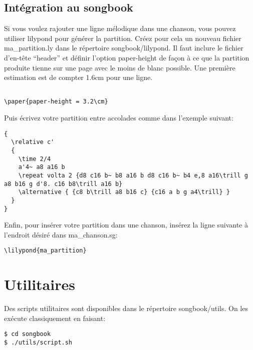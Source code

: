 \documentclass[a4paper,twoside]{article}
\begin{document}
\subsection{Intégration au songbook}

Si vous voulez rajouter une ligne mélodique dans une chanson, vous
pouvez utiliser lilypond pour générer la partition. Créez pour cela un
nouveau fichier ma\_partition.ly dans le répertoire songbook/lilypond.
Il faut inclure le fichier d'en-tête ``header'' et définir l'option
paper-height de façon à ce que la partition produite tienne sur une
page avec le moins de blanc possible. Une première estimation est de
compter 1.6cm pour une ligne.

\begin{verbatim}

\paper{paper-height = 3.2\cm}
\end{verbatim}

Puis écrivez votre partition entre accolades comme dans l'exemple
suivant:

\begin{verbatim}
{
  \relative c'
  {
    \time 2/4
    a'4~ a8 a16 b
    \repeat volta 2 {d8 c16 b~ b8 a16 b d8 c16 b~ b4 e,8 a16\trill g a8 b16 g d'8. c16 b8\trill a16 b}
    \alternative { {c8 b\trill a8 b16 c} {c16 a b g a4\trill} }
  }
}
\end{verbatim}

Enfin, pour insérer votre partition dans une chanson, insérez la ligne
suivante à l'endroit désiré dans ma\_chanson.sg:

\begin{verbatim}
\lilypond{ma_partition}
\end{verbatim}


\section{Utilitaires}\label{sect:utilitaires}

Des scripts utilitaires sont disponibles dans le répertoire
songbook/utils. On les exécute classiquement en faisant:

\begin{verbatim}
$ cd songbook
$ ./utils/script.sh
\end{verbatim}
\end{document}
